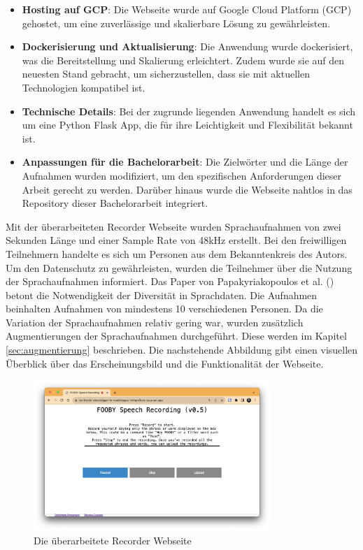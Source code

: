 \documentclass[11pt,a4paper]{article}
\begin{document}
\begin{itemize}
    \item \textbf{Hosting auf GCP}: Die Webseite wurde auf Google Cloud Platform (GCP) gehostet, um 
	eine zuverlässige und skalierbare Lösung zu gewährleisten.
    \item \textbf{Dockerisierung und Aktualisierung}: Die Anwendung wurde dockerisiert, was die 
	Bereitstellung und Skalierung erleichtert. Zudem wurde sie auf den neuesten Stand gebracht, um 
	sicherzustellen, dass sie mit aktuellen Technologien kompatibel ist.
    \item \textbf{Technische Details}: Bei der zugrunde liegenden Anwendung handelt es sich um eine 
	Python Flask App, die für ihre Leichtigkeit und Flexibilität bekannt ist.
    \item \textbf{Anpassungen für die Bachelorarbeit}: Die Zielwörter und die Länge der Aufnahmen 
	wurden modifiziert, um den spezifischen Anforderungen dieser Arbeit gerecht zu werden. Darüber 
	hinaus wurde die Webseite nahtlos in das Repository dieser Bachelorarbeit integriert.
\end{itemize}

\noindent \newline
Mit der überarbeiteten Recorder Webseite wurden Sprachaufnahmen von zwei Sekunden Länge und einer 
Sample Rate von 48kHz erstellt. Bei den freiwilligen Teilnehmern handelte es sich um Personen aus 
dem Bekanntenkreis des Autors. Um den Datenschutz zu gewährleisten, wurden die Teilnehmer über die 
Nutzung der Sprachaufnahmen informiert. Das Paper von Papakyriakopoulos et al. 
(\cite{papakyriakopoulos2023augmented}) betont die Notwendigkeit der Diversität in Sprachdaten. Die 
Aufnahmen beinhalten Aufnahmen von mindestens 10 verschiedenen Personen. Da die Variation der 
Sprachaufnahmen relativ gering war, wurden zusätzlich Augmentierungen der Sprachaufnahmen 
durchgeführt. Diese werden im Kapitel \ref{sec:augmentierung} beschrieben. Die nachstehende 
Abbildung gibt einen visuellen Überblick über das Erscheinungsbild und die Funktionalität der 
Webseite.

\begin{figure}[h]
    \centering
    \includegraphics[width=0.8\textwidth]{img/ba-recorder-website.png} 
    \caption{Die überarbeitete Recorder Webseite}
    \label{fig:recorder_webseite}
\end{figure}
\end{document}
